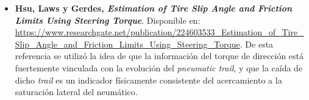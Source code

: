\documentclass{article}
\begin{document}
\begin{itemize}
    \item \textbf{Hsu, Laws y Gerdes, \textit{Estimation of Tire Slip Angle and Friction Limits Using Steering Torque}}. Disponible en: \url{https://www.researchgate.net/publication/224603533_Estimation_of_Tire_Slip_Angle_and_Friction_Limits_Using_Steering_Torque}. De esta referencia se utilizó la idea de que la información del torque de dirección está fuertemente vinculada con la evolución del \textit{pneumatic trail}, y que la caída de dicho \textit{trail} es un indicador físicamente consistente del acercamiento a la saturación lateral del neumático.
\end{itemize}
\end{document}
